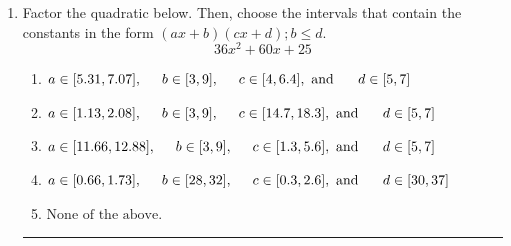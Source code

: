 \documentclass[14pt]{extbook}
\newcommand{\litem}[1]{\item#1\hspace*{-1cm}\rule{\textwidth}{0.4pt}}
\begin{document}
\begin{enumerate}
{\begin{enumerate}[label=\Alph*.]
\end{enumerate} }
\litem{
Factor the quadratic below. Then, choose the intervals that contain the constants in the form $(ax+b)(cx+d); b \leq d.$\[ 36x^{2} +60 x + 25 \]\begin{enumerate}[label=\Alph*.]
\item \( a \in [5.31, 7.07], \hspace*{5mm} b \in [3, 9], \hspace*{5mm} c \in [4, 6.4], \text{ and } \hspace*{5mm} d \in [5, 7] \)
\item \( a \in [1.13, 2.08], \hspace*{5mm} b \in [3, 9], \hspace*{5mm} c \in [14.7, 18.3], \text{ and } \hspace*{5mm} d \in [5, 7] \)
\item \( a \in [11.66, 12.88], \hspace*{5mm} b \in [3, 9], \hspace*{5mm} c \in [1.3, 5.6], \text{ and } \hspace*{5mm} d \in [5, 7] \)
\item \( a \in [0.66, 1.73], \hspace*{5mm} b \in [28, 32], \hspace*{5mm} c \in [0.3, 2.6], \text{ and } \hspace*{5mm} d \in [30, 37] \)
\item \( \text{None of the above.} \)


\end{enumerate}}
\end{enumerate}
\end{document}

